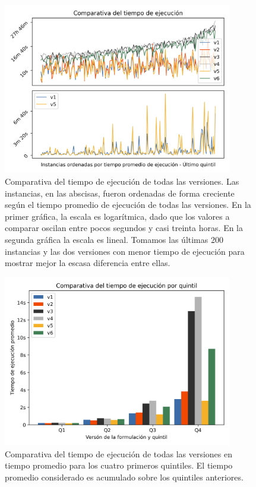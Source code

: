 \documentclass{article}
\begin{document}
  \begin{figure}[h!]
    \centering
    \includegraphics[width=10cm]{../resources/run_time_comparsion.png}
    \caption{Comparativa del tiempo de ejecución de todas las versiones. Las instancias, en las abscisas, fueron ordenadas de forma creciente según el tiempo promedio de ejecución de todas las versiones. En la primer gráfica, la escala es logarítmica, dado que los valores a comparar oscilan entre pocos segundos y casi treinta horas. En la segunda gráfica la escala es lineal. Tomamos las últimas 200 instancias y las dos versiones con menor tiempo de ejecución para mostrar mejor la escasa diferencia entre ellas.}
    \label{fig:runtimecomparison}
  \end{figure}

  \begin{figure}[h!]
    \centering
    \includegraphics[width=10cm]{../resources/run_time_comparsion_by_quintile.png}
      \caption{Comparativa del tiempo de ejecución de todas las versiones en tiempo promedio para los cuatro primeros quintiles. El tiempo promedio considerado es acumulado sobre los quintiles anteriores.}
    \label{fig:firstfourquintiles}
  \end{figure}
\end{document}
